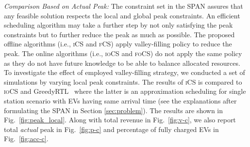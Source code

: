 \documentclass[journal]{IEEEtran}
\newcommand{\revv}[1]{{\color{black}#1}}%
\newcommand{\ics}{\textsc{iCS}\xspace}
\newcommand{\fcs}{\textsc{fCS}\xspace}
\newcommand{\MCSP}{\textsf{SPAN}\xspace}
\newcommand{\focs}{\textsc{foCS}\xspace}
\newcommand{\iocs}{\textsc{ioCS}\xspace}
\begin{document}
			
\revv{\emph{Comparison Based on Actual Peak:}} The constraint set in the \MCSP assures that any feasible solution respects the local and global peak constraints.
An efficient scheduling algorithm may take a further step by not only satisfying the peak constraints but to further reduce the peak as much as possible. The proposed offline algorithms (i.e., \ics and \fcs) apply valley-filling policy to reduce the peak. The  online algorithms (i.e., \iocs and \focs) do not apply the same policy as they do not have future knowledge to be able to balance allocated resources. 
To investigate the effect of employed valley-filling strategy, we conducted a set of simulations by varying local peak constraints. 
The results of \ics is compared to \iocs and GreedyRTL~\cite{Jain} where the latter is an approximation scheduling for single station scenario with EVs having same arrival time (see the explanations after formulating the \MCSP in Section \ref{sec:problem}). 
The results are shown in Fig.~\ref{fig:peak_local}.  
Along with total revenue in Fig.~\ref{fig:v-c}, we also report total \emph{actual} peak in Fig.~\ref{fig:p-c} and percentage of fully charged EVs in Fig.~\ref{fig:acc-c}. 
\end{document}
